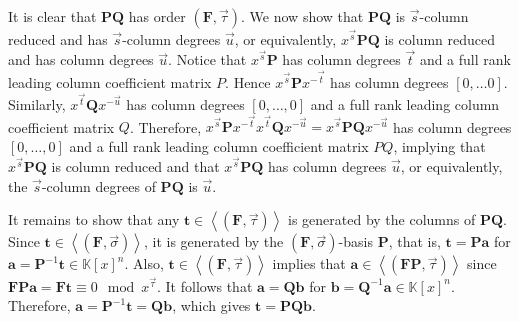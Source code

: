 \begin{pf}
It is clear that $\mathbf{P}\mathbf{Q}$ has order $(\mathbf{F},\vec{\tau})$.
We now show that $\mathbf{P}\mathbf{Q}$ is $\vec{s}$-column reduced
and has $\vec{s}$-column degrees $\vec{u}$, or equivalently, $x^{\vec{s}}\mathbf{P}\mathbf{Q}$
is column reduced and has column degrees $\vec{u}$. Notice that $x^{\vec{s}}\mathbf{P}$
has column degrees $\vec{t}$ and a full rank leading column coefficient
matrix $P$. Hence $x^{\vec{s}}\mathbf{P}x^{-\vec{t}}$ has column
degrees $\left[0,\dots0\right]$. Similarly, $x^{\vec{t}}\mathbf{Q}x^{-\vec{u}}$
has column degrees $[0,\dots,0]$ and a full rank leading column coefficient
matrix $Q$. Therefore, $x^{\vec{s}}\mathbf{P}x^{-\vec{t}}x^{\vec{t}}\mathbf{Q}x^{-\vec{u}}=x^{\vec{s}}\mathbf{P}\mathbf{Q}x^{-\vec{u}}$
has column degrees $[0,\dots,0]$ and a full rank leading column coefficient
matrix $PQ$, implying that $x^{\vec{s}}\mathbf{P}\mathbf{Q}$ is
column reduced and that $x^{\vec{s}}\mathbf{P}\mathbf{Q}$ has column
degrees $\vec{u}$, or equivalently, the $\vec{s}$-column degrees
of $\mathbf{PQ}$ is $\vec{u}$.

It remains to show that any $\mathbf{t}\in\left\langle \left(\mathbf{F},\vec{\tau}\right)\right\rangle $
is generated by the columns of $\mathbf{PQ}$. Since $\mathbf{t}\in\left\langle \left(\mathbf{F},\vec{\sigma}\right)\right\rangle $,
it is generated by the $\left(\mathbf{F},\vec{\sigma}\right)$-basis
$\mathbf{P}$, that is, $\mathbf{t}=\mathbf{P}\mathbf{a}$ for $\mathbf{a}=\mathbf{P}^{-1}\mathbf{t}\in\mathbb{K}\left[x\right]^{n}$.
Also, $\mathbf{t}\in\left\langle \left(\mathbf{F},\vec{\tau}\right)\right\rangle $
implies that $\mathbf{a}\in\left\langle \left(\mathbf{FP},\vec{\tau}\right)\right\rangle $
since $\mathbf{F}\mathbf{P}\mathbf{a}=\mathbf{F}\mathbf{t}\equiv0\mod x^{\vec{\tau}}$.
It follows that $\mathbf{a}=\mathbf{Q}\mathbf{b}$ for $\mathbf{b}=\mathbf{Q}^{-1}\mathbf{a}\in\mathbb{K}\left[x\right]^{n}$.
Therefore, $\mathbf{a}=\mathbf{P}^{-1}\mathbf{t}=\mathbf{Q}\mathbf{b}$,
which gives $\mathbf{t}=\mathbf{P}\mathbf{Q}\mathbf{b}$.
\end{pf}

